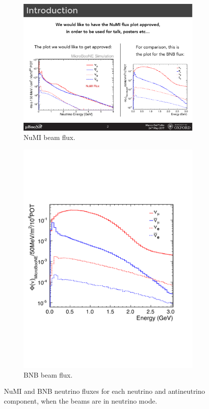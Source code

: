 \begin{figure}[htbp]
\centering
  \begin{subfigure}{0.45\textwidth}
    \includegraphics[width=\linewidth]{figures/numi.pdf}
    \caption{NuMI beam flux.} 
  \end{subfigure}
    \begin{subfigure}{0.45\textwidth}
    \includegraphics[width=\linewidth]{figures/bnb.pdf}
    \caption{BNB beam flux.} 
  \end{subfigure}
  \caption{NuMI and BNB neutrino fluxes for each neutrino and antineutrino component, when the beams are in neutrino mode.}\label{fig:numibeam}
\end{figure}


